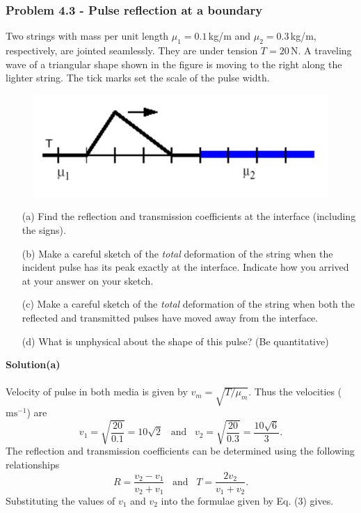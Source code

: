 \documentclass[12pt,a4paper]{article}
\begin{document}
\subsubsection*{Problem 4.3 - Pulse reflection at a boundary }
Two strings with mass per unit length $\mu_1=0.1$\,kg/m and $\mu_2=0.3$\,kg/m, respectively, are jointed seamlessly. They are under tension $T=20$\,N. A traveling wave of a triangular shape shown in the figure is moving to the right along the lighter string. The tick marks set the scale of the pulse width.
\begin{figure}[h]
    \centering
    \includegraphics[width=0.6\linewidth]{figs/fig_prob_4.3.png}
\end{figure}
\begin{enumerate}
    \item[(a)]Find the reflection and transmission coefficients at the interface (including the signs).
    \item[(b)]Make a careful sketch of the \textit{total} deformation of the string when the incident pulse has its peak exactly at the interface. Indicate how you arrived at your answer on your sketch.
    \item[(c)]Make a careful sketch of the \textit{total} deformation of the string when both the reflected and transmitted pulses have moved away from the interface.
    \item[(d)]What is unphysical about the shape of this pulse? (Be quantitative)
\end{enumerate}
\textbf{Solution(a)}
\\
\\Velocity of pulse in both media is given by $v_m=\sqrt{T/\mu_m}$. Thus the velocities ($\text{ms}^{-1}$) are
\[v_1=\sqrt{\frac{20}{0.1}}=10\sqrt{2}\,\,\,\,\,\text{and}\,\,\,\,\,v_2=\sqrt{\frac{20}{0.3}}=\frac{10\sqrt{6}}{3}.\]
The reflection and transmission coefficients can be determined using the following relationships
\begin{equation}
    R=\frac{v_2-v_1}{v_2+v_1}\,\,\,\,\,\text{and}\,\,\,\,\,T=\frac{2v_2}{v_1+v_2}.
\end{equation}
Substituting the values of $v_1$ and $v_2$ into the formulae given by Eq. (3) gives.
\end{document}
